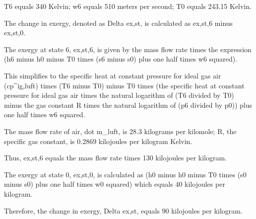 T6 equals 340 Kelvin; w6 equals 510 meters per second; T0 equals 243.15 Kelvin.

The change in exergy, denoted as Delta ex,st, is calculated as ex,st,6 minus ex,st,0.

The exergy at state 6, ex,st,6, is given by the mass flow rate times the expression (h6 minus h0 minus T0 times (s6 minus s0) plus one half times w6 squared).

This simplifies to the specific heat at constant pressure for ideal gas air (cp^ig,luft) times (T6 minus T0) minus T0 times (the specific heat at constant pressure for ideal gas air times the natural logarithm of (T6 divided by T0) minus the gas constant R times the natural logarithm of (p6 divided by p0)) plus one half times w6 squared.

The mass flow rate of air, dot m_luft, is 28.3 kilograms per kilomole; R, the specific gas constant, is 0.2869 kilojoules per kilogram Kelvin.

Thus, ex,st,6 equals the mass flow rate times 130 kilojoules per kilogram.

The exergy at state 0, ex,st,0, is calculated as (h0 minus h0 minus T0 times (s0 minus s0) plus one half times w0 squared) which equals 40 kilojoules per kilogram.

Therefore, the change in exergy, Delta ex,st, equals 90 kilojoules per kilogram.